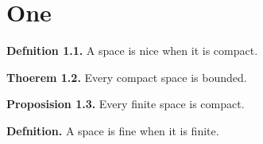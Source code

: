 \documentclass{article}
\begin{document}
\section{One}
\textbf{Defnition 1.1.} A space is nice when it is compact.

\textbf{Thoerem 1.2.} Every compact space is bounded.

\textbf{Proposision 1.3.} Every finite space is compact.

\textbf{Defnition.} A space is fine when it is finite.
\end{document}
